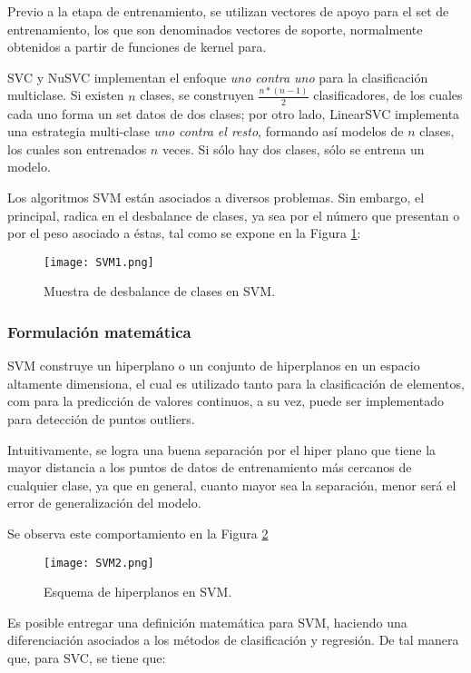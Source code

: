 Previo a la etapa de entrenamiento, se utilizan vectores de apoyo para el set de entrenamiento, los que son denominados vectores de soporte, normalmente obtenidos a partir de funciones de kernel para.

SVC y NuSVC implementan el enfoque \textit{uno contra uno} para la clasificación multiclase. Si existen $n$ clases, se construyen $\frac{n*(n-1)}{2}$ clasificadores, de los cuales cada uno forma un set datos de dos clases; por otro lado, LinearSVC implementa una estrategia multi-clase \textit{uno contra el resto}, formando así modelos de $n$ clases, los cuales son entrenados $n$ veces. Si sólo hay dos clases, sólo se entrena un modelo.

Los algoritmos SVM están asociados a diversos problemas. Sin embargo, el principal, radica en el desbalance de clases, ya sea por el número que presentan o por el peso asociado a éstas, tal como se expone en la Figura  \ref{SVM1}:

\begin{figure}[!h]
	
	\centering
	\texttt{[image: SVM1.png]}
	\caption{Muestra de desbalance de clases en SVM.}
	\label{SVM1}
\end{figure}

\subsubsection{Formulación matemática}

SVM construye un hiperplano o un conjunto de hiperplanos en un espacio altamente dimensiona, el cual es utilizado tanto para la clasificación de elementos, com para la predicción de valores continuos, a su vez, puede ser implementado para detección de puntos outliers. 

Intuitivamente, se logra una buena separación por el hiper plano que tiene la mayor distancia a los puntos de datos de entrenamiento más cercanos de cualquier clase, ya que en general, cuanto mayor sea la separación, menor será el error de generalización del modelo.

Se observa este comportamiento en la Figura \ref{SVM2}

\begin{figure}[!h]
	\centering
	\texttt{[image: SVM2.png]}
	\caption{Esquema de hiperplanos en SVM.}
	\label{SVM2}
	
\end{figure}

Es posible entregar una definición matemática para SVM, haciendo una diferenciación asociados a los métodos de clasificación y regresión. De tal manera que, para SVC, se tiene que:

